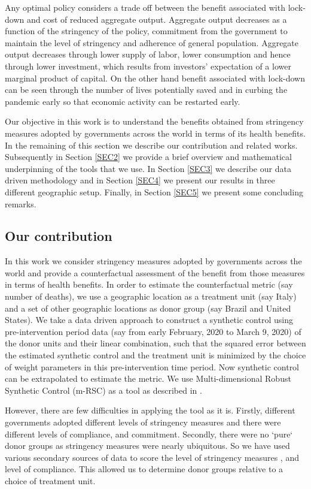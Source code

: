 \documentclass[final,authoryear,5p,times,twocolumn]{elsarticle}
\begin{document}
	Any optimal policy considers a trade off between the benefit associated with lock-down and cost of reduced aggregate output. Aggregate output decreases as a function of the stringency of the policy, commitment from the government to maintain the level of stringency and adherence of general population. Aggregate output decreases through lower supply of labor, lower consumption and hence through lower investment, which results from investors’ expectation of a lower marginal product of capital. On the other hand benefit associated with lock-down can be seen through the number of lives potentially saved and in curbing the pandemic early so that economic activity can be restarted early. 
	
	Our objective in this work is to understand the benefits obtained from stringency measures adopted by governments across the world in terms of its health benefits. In the remaining of this section we describe our contribution and related  works. Subsequently in Section \ref{SEC2} we provide a brief overview and mathematical underpinning of the tools that we use. In Section \ref{SEC3} we describe our data driven methodology and in Section \ref{SEC4} we present our results in three different geographic setup. Finally, in Section \ref{SEC5} we present some concluding remarks.
	
	\subsection{Our contribution}
	In this work we consider stringency measures adopted by governments across the world and provide a counterfactual assessment of the benefit from those measures in terms of health benefits. In order to estimate the counterfactual metric (say number of deaths), we use a geographic location as a treatment unit (say Italy) and a set of other geographic locations as donor group (say Brazil and United States). We take a data driven approach to construct a synthetic control \cite{ap08746, JMLR18, AMSS19} using pre-intervention period data (say from early February, 2020 to March 9, 2020) of the donor units and their linear combination, such that the squared error between the estimated synthetic control  and the treatment unit is minimized by the choice of weight parameters in this pre-intervention time period. Now synthetic control can be extrapolated to estimate the metric. We use Multi-dimensional Robust Synthetic Control (m-RSC) as a tool as described in \cite{AMSS19}. 
	
	However, there are few difficulties in applying the tool as it is.  Firstly, different governments adopted different levels of stringency measures and there were different levels of compliance, and commitment. Secondly, there were no `pure` donor groups as stringency measures were nearly ubiquitous. So we have used various secondary sources of data to score the level of stringency measures , and level of compliance. This allowed us to determine donor groups relative to a choice of treatment unit.
	
\end{document}

